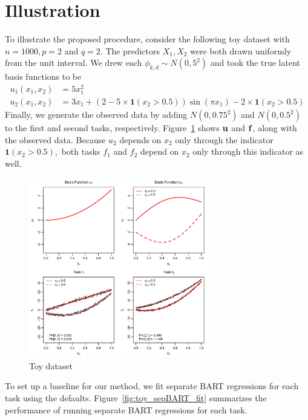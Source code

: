 \documentclass[12pt]{article}
\begin{document}
\section{Illustration}

To illustrate the proposed procedure, consider the following toy dataset with $n = 1000, p = 2$ and $q = 2.$
The predictors $X_{1}, X_{2}$ were both drawn uniformly from the unit interval.
We drew each $\phi_{k,d} \sim N(0,5^{2})$ and took the true latent basis functions to be
\begin{align*}
u_{1}(x_{1},x_{2}) &= 5x_{1}^{2} \\
u_{2}(x_{1},x_{2}) &= 3x_{1} + (2 - 5\times \mathbf{1}(x_{2} > 0.5))\sin\left(\pi x_{1}\right) - 2 \times \mathbf{1}(x_{2} > 0.5)
\end{align*}
Finally, we generate the observed data by adding $N(0,0.75^{2})$ and $N(0, 0.5^{2})$ to the first and second tasks, respectively.
Figure~\ref{fig:toy_example_data} shows $\bu$ and $\bf$, along with the observed data.
Because $u_{2}$ depends on $x_{2}$ only through the indicator $\mathbf{1}(x_{2} > 0.5),$ both tasks $f_{1}$ and $f_{2}$ depend on $x_{2}$ only through this indicator as well.

\begin{figure}[H]
\centering
\includegraphics[width = 0.7\textwidth]{../images/toy_example_data.png}
\caption{Toy dataset}
\label{fig:toy_example_data}
\end{figure}

To set up a baseline for our method, we fit separate BART regressions for each task using the \citet{Chipman2010} defaults.
Figure~\ref{fig:toy_sepBART_fit} summarizes the performance of running separate BART regressions for each task.
\end{document}
